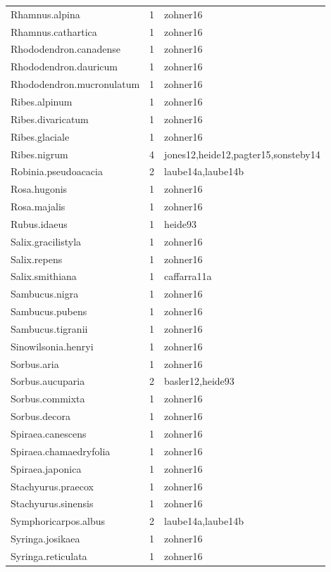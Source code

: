 \documentclass{article}
\begin{document}
\begin{footnotesize}
\begin{longtable}{|p{}|p{}|p{}|}
  Rhamnus.alpina &   1 & zohner16 \\ 
  Rhamnus.cathartica &   1 & zohner16 \\ 
  Rhododendron.canadense &   1 & zohner16 \\ 
  Rhododendron.dauricum &   1 & zohner16 \\ 
  Rhododendron.mucronulatum &   1 & zohner16 \\ 
  Ribes.alpinum &   1 & zohner16 \\ 
  Ribes.divaricatum &   1 & zohner16 \\ 
  Ribes.glaciale &   1 & zohner16 \\ 
  Ribes.nigrum &   4 & jones12,heide12,pagter15,sonsteby14 \\ 
  Robinia.pseudoacacia &   2 & laube14a,laube14b \\ 
  Rosa.hugonis &   1 & zohner16 \\ 
  Rosa.majalis &   1 & zohner16 \\ 
  Rubus.idaeus &   1 & heide93 \\ 
  Salix.gracilistyla &   1 & zohner16 \\ 
  Salix.repens &   1 & zohner16 \\ 
  Salix.smithiana &   1 & caffarra11a \\ 
  Sambucus.nigra &   1 & zohner16 \\ 
  Sambucus.pubens &   1 & zohner16 \\ 
  Sambucus.tigranii &   1 & zohner16 \\ 
  Sinowilsonia.henryi &   1 & zohner16 \\ 
  Sorbus.aria &   1 & zohner16 \\ 
  Sorbus.aucuparia &   2 & basler12,heide93 \\ 
  Sorbus.commixta &   1 & zohner16 \\ 
  Sorbus.decora &   1 & zohner16 \\ 
  Spiraea.canescens &   1 & zohner16 \\ 
  Spiraea.chamaedryfolia &   1 & zohner16 \\ 
  Spiraea.japonica &   1 & zohner16 \\ 
  Stachyurus.praecox &   1 & zohner16 \\ 
  Stachyurus.sinensis &   1 & zohner16 \\ 
  Symphoricarpos.albus &   2 & laube14a,laube14b \\ 
  Syringa.josikaea &   1 & zohner16 \\ 
  Syringa.reticulata &   1 & zohner16 \\ 

\end{longtable}
\end{footnotesize}
\end{document}

